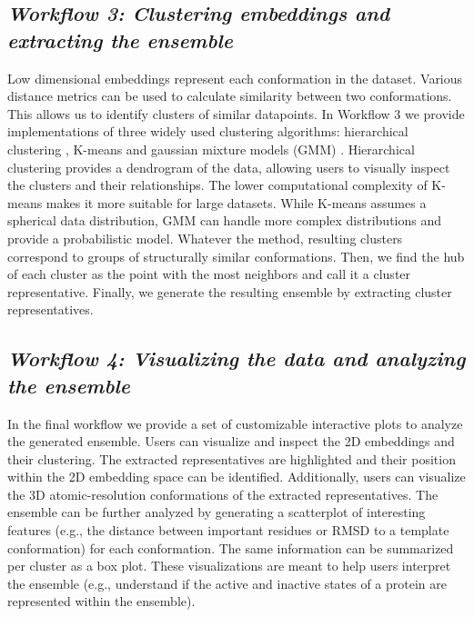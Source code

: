 \documentclass[numsec,webpdf,contemporary,large]{oup-authoring-template}
\theoremstyle{thmstyleone}%
\theoremstyle{thmstyletwo}%
\theoremstyle{thmstylethree}%
\begin{document}
\subsection{\textit{\textbf{Workflow 3:} Clustering embeddings and extracting the ensemble}}\label{wf1}

Low dimensional embeddings represent each conformation in the dataset. Various distance metrics can be used to calculate similarity between two conformations. This allows us to identify clusters of similar datapoints. In Workflow 3 we provide implementations of three widely used clustering algorithms: hierarchical clustering \citep{murtagh_algorithms_2012}, K-means \citep{hartigan_algorithm_1979} and  gaussian mixture models (GMM) \citep{lindsay_mixture_1989}. Hierarchical clustering provides a dendrogram of the data, allowing users to visually inspect the clusters and their relationships. The lower computational complexity of K-means makes it more suitable for large datasets. While K-means assumes a spherical data distribution, GMM can handle more complex distributions and provide a probabilistic model. Whatever the method, resulting clusters correspond to groups of structurally similar conformations. Then, we find the hub of each cluster as the point with the most neighbors and call it a cluster representative. Finally, we generate the resulting ensemble by extracting cluster representatives.  

\subsection{\textit{\textbf{Workflow 4:} Visualizing the data and analyzing the ensemble}}\label{wf1}

In the final workflow we provide a set of customizable interactive plots to analyze the generated ensemble. Users can visualize and inspect the 2D embeddings and their clustering. The extracted representatives are highlighted and their position within the 2D embedding space can be identified. Additionally, users can visualize the 3D atomic-resolution conformations of the extracted representatives. The ensemble can be further analyzed by generating a scatterplot of interesting features (e.g., the distance between important residues or RMSD to a template conformation) for each conformation. The same information can be summarized per cluster as a box plot. These visualizations are meant to help users interpret the ensemble (e.g., understand if the active and inactive states of a protein are represented within the ensemble).
\end{document}
